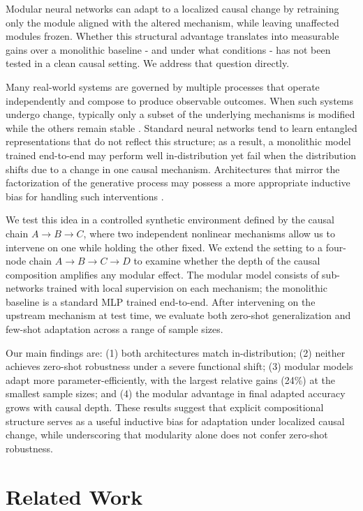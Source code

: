 \documentclass{article}
\begin{document}
Modular neural networks can adapt to a localized causal change by retraining only
the module aligned with the altered mechanism, while leaving unaffected modules
frozen. Whether this structural advantage translates into measurable gains over a
monolithic baseline - and under what conditions - has not been tested in a clean
causal setting. We address that question directly.

Many real-world systems are governed by multiple processes that operate
independently and compose to produce observable outcomes. When such systems undergo
change, typically only a subset of the underlying mechanisms is modified while the
others remain stable \citep{pearl2009causality}. Standard neural networks tend to
learn entangled representations \citep{locatello2019challenging} that do not reflect
this structure; as a result, a monolithic model trained end-to-end may perform well
in-distribution yet fail when the distribution shifts due to a change in one causal
mechanism. Architectures that mirror the factorization of the generative process may
possess a more appropriate inductive bias for handling such interventions
\citep{bengio2019meta}.

We test this idea in a controlled synthetic environment defined by the causal chain
$A\!\rightarrow\!B\!\rightarrow\!C$, where two independent nonlinear mechanisms
allow us to intervene on one while holding the other fixed. We extend the setting
to a four-node chain $A\!\rightarrow\!B\!\rightarrow\!C\!\rightarrow\!D$ to examine
whether the depth of the causal composition amplifies any modular effect. The
modular model consists of sub-networks trained with local supervision on each
mechanism; the monolithic baseline is a standard MLP trained end-to-end. After
intervening on the upstream mechanism at test time, we evaluate both zero-shot
generalization and few-shot adaptation across a range of sample sizes.

Our main findings are: (1) both architectures match in-distribution; (2) neither
achieves zero-shot robustness under a severe functional shift; (3) modular models
adapt more parameter-efficiently, with the largest relative gains (24\%) at the
smallest sample sizes; and (4) the modular advantage in final adapted accuracy
grows with causal depth. These results suggest that explicit compositional
structure serves as a useful inductive bias for adaptation under localized causal
change, while underscoring that modularity alone does not confer zero-shot
robustness.


\section{Related Work}
\label{sec:related}
\end{document}
